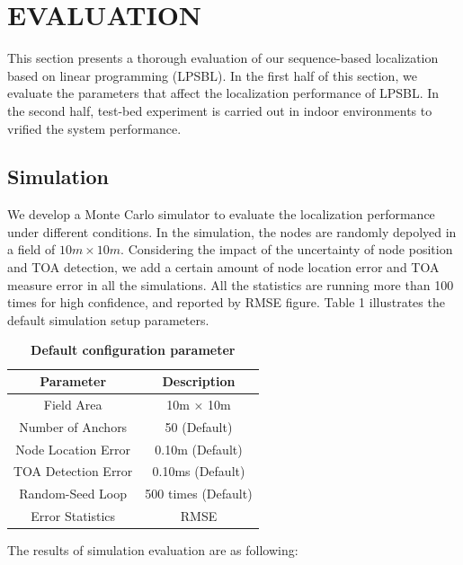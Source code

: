 \section{EVALUATION }
\label{section:results}
This section presents a thorough evaluation of our sequence-based localization based on linear programming (LPSBL).
In the first half of this section, we evaluate the parameters that affect the localization performance of LPSBL.
In the second half, test-bed experiment is carried out in indoor environments to vrified the system performance.

\subsection{Simulation}
We develop a Monte Carlo simulator to evaluate the localization performance under different conditions.
In the simulation, the nodes are randomly depolyed in a field of $10m \times 10m$. 
Considering the impact of the uncertainty of node position and TOA detection, we add a certain amount of node location error and TOA measure error in all the simulations.
All the statistics are running more than 100 times for high confidence, and reported by RMSE figure. 
Table 1 illustrates the default simulation setup parameters.

\begin{table} \normalsize
\caption {\textbf{Default configuration parameter}} %
\centering %
    \begin{tabular}{|c|c|}
        \hline
Parameter & Description \\
 \hline
Field Area & 10m $\times$ 10m \\
\hline
Number of Anchors & 50 (Default) \\
 \hline
Node Location Error 	 & 0.10m (Default) \\
 \hline
TOA Detection Error 	 & 0.10ms (Default) \\
 \hline
Random-Seed Loop	 & 500 times (Default) \\
 \hline
Error Statistics	 &  RMSE \\
        \hline
    \end{tabular}
\end{table}



The results of simulation evaluation are as following:

